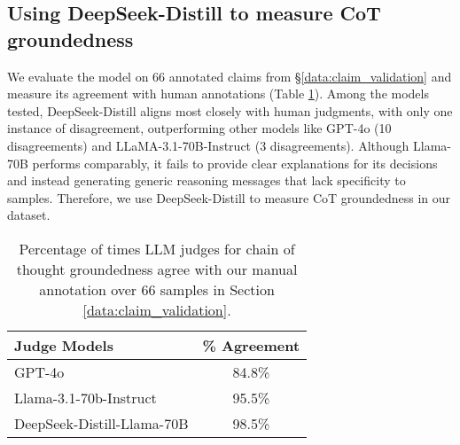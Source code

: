 \subsection{Using DeepSeek-Distill to measure CoT groundedness} 
\label{appendix:deepseek-cot}
We evaluate the model on 66 annotated claims from \S\ref{data:claim_validation} and measure its agreement with human annotations (Table \ref{tab:judge_agreement}). Among the models tested, DeepSeek-Distill aligns most closely with human judgments, with only one instance of disagreement, outperforming other models like GPT-4o (10 disagreements) and LLaMA-3.1-70B-Instruct (3 disagreements). Although Llama-70B performs comparably, it fails to provide clear explanations for its decisions and instead generating generic reasoning messages that lack specificity to samples. Therefore, we use DeepSeek-Distill to measure CoT groundedness in our dataset.

\begin{table}[htbp]
    \small
    \centering
    \begin{tabular}{lc}
        \toprule
        Judge Models & \% Agreement \\
        \midrule
        GPT-4o & 84.8\% \\
        Llama-3.1-70b-Instruct & 95.5\% \\
        DeepSeek-Distill-Llama-70B & 98.5\%\\
         \bottomrule
    \end{tabular}
    \caption{Percentage of times LLM judges for chain of thought groundedness agree with our manual annotation over 66 samples in Section \ref{data:claim_validation}.}
    \label{tab:judge_agreement}
\end{table}